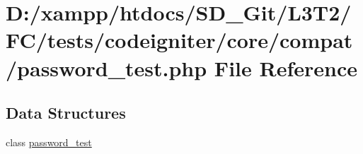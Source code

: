 \hypertarget{tests_2codeigniter_2core_2compat_2password__test_8php}{}\section{D\+:/xampp/htdocs/\+S\+D\+\_\+\+Git/\+L3\+T2/\+F\+C/tests/codeigniter/core/compat/password\+\_\+test.php File Reference}
\label{tests_2codeigniter_2core_2compat_2password__test_8php}
\subsection*{Data Structures}
\begin{DoxyCompactItemize}
\item 
class \hyperlink{classpassword__test}{password\+\_\+test}
\end{DoxyCompactItemize}
